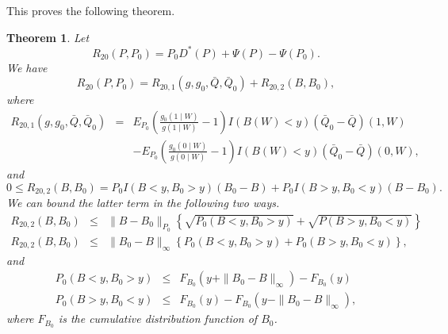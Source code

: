 \documentclass[11pt]{article}
\newtheorem{theorem}{Theorem}
\newcommand{\pl}{\parallel}
\begin{document}
This proves the following theorem.

\begin{theorem}
Let
\[
R_{20}(P,P_0)=P_0D^*(P)+\Psi(P)-\Psi(P_0).\]
We have
\[
R_{20}(P,P_0)=R_{20,1}(g,g_0,\bar{Q},\bar{Q}_0)+R_{20,2}(B,B_0),\]
where
\begin{eqnarray*}
R_{20,1}(g,g_0,\bar{Q},\bar{Q}_0)&=& E_{P_0} \left( \frac{g_0(1\mid W)}{g(1\mid W)}-1\right) I(B(W)<y)(\bar{Q}_0-\bar{Q})(1,W)\\
&&-E_{P_0}\left ( \frac{g_0(0\mid W)}{g(0\mid W)}-1\right) I(B(W)<y)(\bar{Q}_0-\bar{Q})(0,W),
\end{eqnarray*}
and
\[
0\leq R_{20,2}(B,B_0)=P_0I(B<y,B_0>y)(B_0-B)
+P_0I(B>y,B_0<y)(B-B_0).
\]
We can bound the latter term in the following two ways.
\begin{eqnarray*}
R_{20,2}(B,B_0)&\leq & \pl B-B_0\pl_{P_0}\left\{\sqrt{P_0(B<y,B_0>y)}+\sqrt{P(B>y,B_0<y)}\right\}\\
R_{20,2}(B,B_0)&\leq & \pl B_0-B\pl_{\infty}\left\{P_0(B<y,B_0>y)+P_0(B>y,B_0<y)\right\},
\end{eqnarray*}
and 
\begin{eqnarray*}
P_0(B<y,B_0>y)&\leq& F_{B_0}(y+\pl B_0-B\pl_{\infty})-F_{B_0}(y)\\
P_0(B>y,B_0<y)&\leq & F_{B_0}(y)-F_{B_0}(y-\pl B_0-B\pl_{\infty}),
\end{eqnarray*}
where $F_{B_0}$ is the cumulative distribution function of $B_0$.
\end{theorem}
\end{document}
